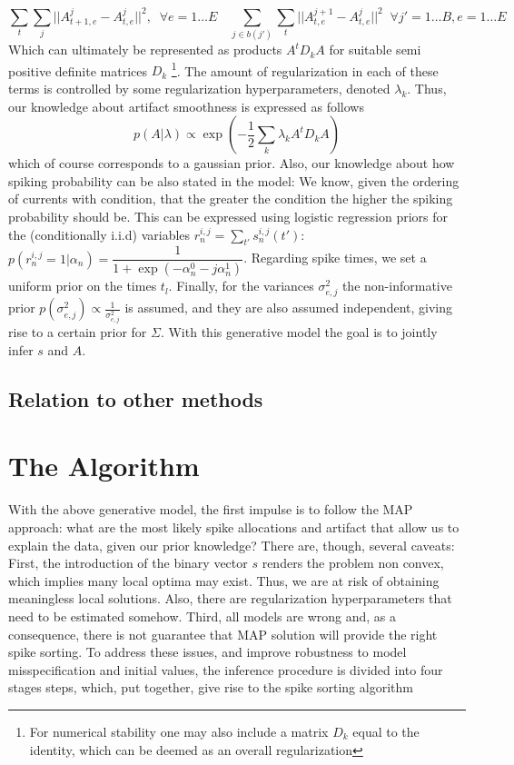\documentclass[12pt,letterpaper,fleqn]{article}
\begin{document}
$$\sum_t\sum_j ||A_{t+1,e}^j-A_{t,e}^j||^2,\;\;\forall e=1\ldots E\quad \sum_{j\in b(j')}\sum_t ||A_{t,e}^{j+1}-A_{t,e}^j||^2\;\; \forall j' =1\ldots B,e=1\ldots E$$
Which can ultimately be represented as products $A^tD_{k}A$ for suitable semi positive definite matrices $D_{k}$ \footnote{For numerical stability one may also include a matrix $D_{k}$ equal to the identity, which can be deemed as an overall regularization}. The amount of regularization in each of these terms is controlled by some regularization hyperparameters, denoted $\lambda_k$. Thus, our knowledge about artifact smoothness is expressed as follows
$$p(A|\lambda)\propto \exp\left(-\dfrac{1}{2} \sum_k \lambda_k A^tD_kA\right)$$
which of course corresponds to a gaussian prior.
Also, our knowledge about how spiking probability can be also stated in the model: We know, given the ordering of currents with condition, that the greater the condition the higher the spiking probability should be. This can be expressed using logistic regression priors for the (conditionally i.i.d) variables $r_n^{i,j}=\sum_{t'}s_n^{i,j}(t')$:
$p(r_n^{i,j}=1|\alpha_n)=\dfrac{1}{1+\exp\left(-\alpha^0_n-j\alpha^1_n  \right)}$. Regarding spike times, we set a uniform prior on the times $t_{l}$. Finally, for the variances $\sigma^2_{e,j}$ the non-informative prior $p(\sigma^2_{e,j})\propto \frac{1}{\sigma^2_{e,j}}$ is assumed, and they are also assumed independent, giving rise to a certain prior for $\Sigma$. With this generative model the goal is to jointly infer $s$ and $A$.
\subsection{Relation to other methods}
\section{The Algorithm}
With the above generative model, the first impulse is to follow the MAP approach: what are the most likely spike allocations and artifact that allow us to explain the data, given our prior knowledge? There are, though, several caveats: First, the introduction of the binary vector $s$ renders the problem non convex, which implies many local optima may exist. Thus, we are at risk of obtaining meaningless local solutions. Also, there are regularization hyperparameters that need to be estimated somehow. Third, all models are wrong and, as a consequence, there is not guarantee that MAP solution will provide the right spike sorting. To address these issues, and improve robustness to model misspecification and initial values, the inference procedure is divided into four stages steps, which, put together, give rise to the spike sorting algorithm
\end{document}
